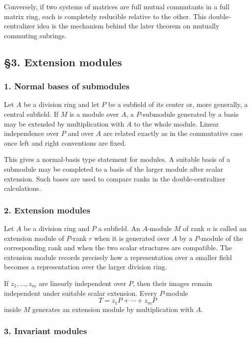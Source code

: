 \documentclass[11pt]{article}
\begin{document}
Conversely, if two systems of matrices are full mutual commutants in a
full matrix ring, each is completely reducible relative to the other.
This double-centralizer idea is the mechanism behind the later theorem
on mutually commuting subrings.

\subsection{§3. Extension modules}\label{extension-modules}

\subsubsection{1. Normal bases of
submodules}\label{normal-bases-of-submodules}

Let \(A\) be a division ring and let \(P\) be a subfield of its center
or, more generally, a central subfield. If \(M\) is a module over \(A\),
a \(P\)-submodule generated by a basis may be extended by multiplication
with \(A\) to the whole module. Linear independence over \(P\) and over
\(A\) are related exactly as in the commutative case once left and right
conventions are fixed.

This gives a normal-basis type statement for modules. A suitable basis
of a submodule may be completed to a basis of the larger module after
scalar extension. Such bases are used to compare ranks in the
double-centralizer calculations.

\subsubsection{2. Extension modules}\label{extension-modules-1}

Let \(A\) be a division ring and \(P\) a subfield. An \(A\)-module \(M\)
of rank \(n\) is called an extension module of \(P\)-rank \(r\) when it
is generated over \(A\) by a \(P\)-module of the corresponding rank and
when the two scalar structures are compatible. The extension module
records precisely how a representation over a smaller field becomes a
representation over the larger division ring.

If \(z_1,
\ldots,z_m\) are linearly independent over \(P\), then their images
remain independent under suitable scalar extension. Every \(P\)-module
\[
  T=z_1P+
\cdots+z_mP
\] inside \(M\) generates an extension module by multiplication with
\(A\).

\subsubsection{3. Invariant modules}\label{invariant-modules}
\end{document}
